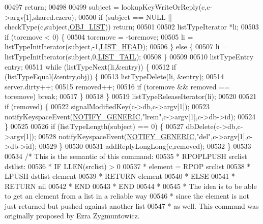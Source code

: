 \begin{DoxyCode}
00497         \textcolor{keywordflow}{return};
00498 
00499     subject = lookupKeyWriteOrReply(c,c->argv[1],shared.czero);
00500     \textcolor{keywordflow}{if} (subject == NULL || checkType(c,subject,\hyperlink{server_8h_a4a5f22a280949c97a0cb0d4213275126}{OBJ\_LIST})) \textcolor{keywordflow}{return};
00501 
00502     listTypeIterator *li;
00503     \textcolor{keywordflow}{if} (toremove < 0) \{
00504         toremove = -toremove;
00505         li = listTypeInitIterator(subject,-1,\hyperlink{server_8h_a5fc6a15ca26c6208f66ad2768a3108ef}{LIST\_HEAD});
00506     \} \textcolor{keywordflow}{else} \{
00507         li = listTypeInitIterator(subject,0,\hyperlink{server_8h_a745de98bef5b645df56479181803235b}{LIST\_TAIL});
00508     \}
00509 
00510     listTypeEntry entry;
00511     \textcolor{keywordflow}{while} (listTypeNext(li,&entry)) \{
00512         \textcolor{keywordflow}{if} (listTypeEqual(&entry,obj)) \{
00513             listTypeDelete(li, &entry);
00514             server.dirty++;
00515             removed++;
00516             \textcolor{keywordflow}{if} (toremove && removed == toremove) \textcolor{keywordflow}{break};
00517         \}
00518     \}
00519     listTypeReleaseIterator(li);
00520 
00521     \textcolor{keywordflow}{if} (removed) \{
00522         signalModifiedKey(c->db,c->argv[1]);
00523         notifyKeyspaceEvent(\hyperlink{server_8h_a9fa53dd1068e62365f3964ad3479eec2}{NOTIFY\_GENERIC},\textcolor{stringliteral}{"lrem"},c->argv[1],c->db->id);
00524     \}
00525 
00526     \textcolor{keywordflow}{if} (listTypeLength(subject) == 0) \{
00527         dbDelete(c->db,c->argv[1]);
00528         notifyKeyspaceEvent(\hyperlink{server_8h_a9fa53dd1068e62365f3964ad3479eec2}{NOTIFY\_GENERIC},\textcolor{stringliteral}{"del"},c->argv[1],c->db->id);
00529     \}
00530 
00531     addReplyLongLong(c,removed);
00532 \}
00533 
00534 \textcolor{comment}{/* This is the semantic of this command:}
00535 \textcolor{comment}{ *  RPOPLPUSH srclist dstlist:}
00536 \textcolor{comment}{ *    IF LLEN(srclist) > 0}
00537 \textcolor{comment}{ *      element = RPOP srclist}
00538 \textcolor{comment}{ *      LPUSH dstlist element}
00539 \textcolor{comment}{ *      RETURN element}
00540 \textcolor{comment}{ *    ELSE}
00541 \textcolor{comment}{ *      RETURN nil}
00542 \textcolor{comment}{ *    END}
00543 \textcolor{comment}{ *  END}
00544 \textcolor{comment}{ *}
00545 \textcolor{comment}{ * The idea is to be able to get an element from a list in a reliable way}
00546 \textcolor{comment}{ * since the element is not just returned but pushed against another list}
00547 \textcolor{comment}{ * as well. This command was originally proposed by Ezra Zygmuntowicz.}

\end{DoxyCode}
